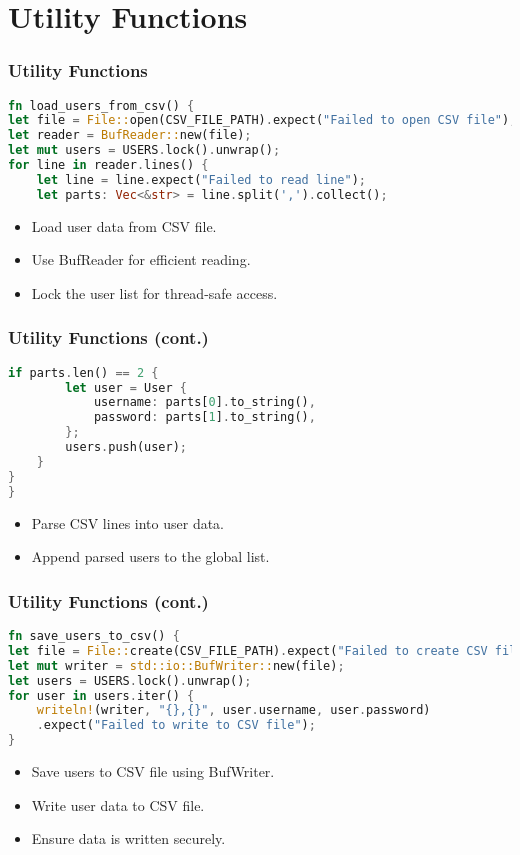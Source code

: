 \documentclass[aspectratio=169, table]{beamer}
\begin{document}
\section{Utility Functions}
\begin{frame}[fragile]
\frametitle{Utility Functions}
\begin{lstlisting}[language=Rust]
fn load_users_from_csv() {
let file = File::open(CSV_FILE_PATH).expect("Failed to open CSV file");
let reader = BufReader::new(file);
let mut users = USERS.lock().unwrap();
for line in reader.lines() {
	let line = line.expect("Failed to read line");
	let parts: Vec<&str> = line.split(',').collect();
\end{lstlisting}
\begin{itemize}
	\item Load user data from CSV file.
	\item Use BufReader for efficient reading.
	\item Lock the user list for thread-safe access.
\end{itemize}
\end{frame}

\begin{frame}[fragile]
\frametitle{Utility Functions (cont.)}
\begin{lstlisting}[language=Rust]
	if parts.len() == 2 {
		let user = User {
			username: parts[0].to_string(),
			password: parts[1].to_string(),
		};
		users.push(user);
	}
}
}


\end{lstlisting}
\begin{itemize}
\item Parse CSV lines into user data.
\item Append parsed users to the global list.

\end{itemize}
\end{frame}

\begin{frame}[fragile]
\frametitle{Utility Functions (cont.)}
\begin{lstlisting}[language=Rust]
fn save_users_to_csv() {
let file = File::create(CSV_FILE_PATH).expect("Failed to create CSV file");
let mut writer = std::io::BufWriter::new(file);
let users = USERS.lock().unwrap();
for user in users.iter() {
	writeln!(writer, "{},{}", user.username, user.password)
	.expect("Failed to write to CSV file");
}
\end{lstlisting}
\begin{itemize}
\item Save users to CSV file using BufWriter.
\item Write user data to CSV file.
\item Ensure data is written securely.
\end{itemize}
\end{frame}
\end{document}
